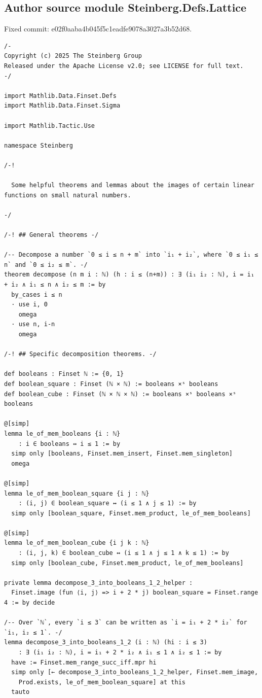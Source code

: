 \documentclass[10pt,a4paper]{article}
\begin{document}
\subsection*{Author source module Steinberg.Defs.Lattice}
\noindent Fixed commit: e02f0aaba4b045f5c1eadfe9078a3027a3b52d68.
\begin{Verbatim}
/-
Copyright (c) 2025 The Steinberg Group
Released under the Apache License v2.0; see LICENSE for full text.
-/

import Mathlib.Data.Finset.Defs
import Mathlib.Data.Finset.Sigma

import Mathlib.Tactic.Use

namespace Steinberg

/-!

  Some helpful theorems and lemmas about the images of certain linear functions on small natural numbers.

-/

/-! ## General theorems -/

/-- Decompose a number `0 ≤ i ≤ n + m` into `i₁ + i₂`, where `0 ≤ i₁ ≤ n` and `0 ≤ i₂ ≤ m`. -/
theorem decompose (n m i : ℕ) (h : i ≤ (n+m)) : ∃ (i₁ i₂ : ℕ), i = i₁ + i₂ ∧ i₁ ≤ n ∧ i₂ ≤ m := by
  by_cases i ≤ n
  · use i, 0
    omega
  · use n, i-n
    omega

/-! ## Specific decomposition theorems. -/

def booleans : Finset ℕ := {0, 1}
def boolean_square : Finset (ℕ × ℕ) := booleans ×ˢ booleans
def boolean_cube : Finset (ℕ × ℕ × ℕ) := booleans ×ˢ booleans ×ˢ booleans

@[simp]
lemma le_of_mem_booleans {i : ℕ}
    : i ∈ booleans ↔ i ≤ 1 := by
  simp only [booleans, Finset.mem_insert, Finset.mem_singleton]
  omega

@[simp]
lemma le_of_mem_boolean_square {i j : ℕ}
    : (i, j) ∈ boolean_square ↔ (i ≤ 1 ∧ j ≤ 1) := by
  simp only [boolean_square, Finset.mem_product, le_of_mem_booleans]

@[simp]
lemma le_of_mem_boolean_cube {i j k : ℕ}
    : (i, j, k) ∈ boolean_cube ↔ (i ≤ 1 ∧ j ≤ 1 ∧ k ≤ 1) := by
  simp only [boolean_cube, Finset.mem_product, le_of_mem_booleans]

private lemma decompose_3_into_booleans_1_2_helper :
  Finset.image (fun ⟨i, j⟩ => i + 2 * j) boolean_square = Finset.range 4 := by decide

/-- Over `ℕ`, every `i ≤ 3` can be written as `i = i₁ + 2 * i₂` for `i₁, i₂ ≤ 1`. -/
lemma decompose_3_into_booleans_1_2 (i : ℕ) (hi : i ≤ 3)
    : ∃ (i₁ i₂ : ℕ), i = i₁ + 2 * i₂ ∧ i₁ ≤ 1 ∧ i₂ ≤ 1 := by
  have := Finset.mem_range_succ_iff.mpr hi
  simp only [← decompose_3_into_booleans_1_2_helper, Finset.mem_image,
    Prod.exists, le_of_mem_boolean_square] at this
  tauto


\end{Verbatim}
\end{document}

